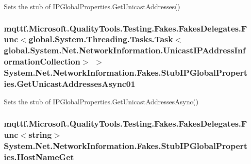 Sets the stub of I\-P\-Global\-Properties.\-Get\-Unicast\-Addresses()

\hypertarget{class_system_1_1_net_1_1_network_information_1_1_fakes_1_1_stub_i_p_global_properties_aa64c82eebf83d5297875fd65a2bcd978}{
\subsubsection[{Get\-Unicast\-Addresses\-Async01}]{\setlength{\rightskip}{0pt plus 5cm}mqttf.\-Microsoft.\-Quality\-Tools.\-Testing.\-Fakes.\-Fakes\-Delegates.\-Func$<$global.\-System.\-Threading.\-Tasks.\-Task$<$global.\-System.\-Net.\-Network\-Information.\-Unicast\-I\-P\-Address\-Information\-Collection$>$ $>$ System.\-Net.\-Network\-Information.\-Fakes.\-Stub\-I\-P\-Global\-Properties.\-Get\-Unicast\-Addresses\-Async01}}\label{class_system_1_1_net_1_1_network_information_1_1_fakes_1_1_stub_i_p_global_properties_aa64c82eebf83d5297875fd65a2bcd978}


Sets the stub of I\-P\-Global\-Properties.\-Get\-Unicast\-Addresses\-Async()

\hypertarget{class_system_1_1_net_1_1_network_information_1_1_fakes_1_1_stub_i_p_global_properties_af7d0577b0832c7aa0039246d5263753f}{
\subsubsection[{Host\-Name\-Get}]{\setlength{\rightskip}{0pt plus 5cm}mqttf.\-Microsoft.\-Quality\-Tools.\-Testing.\-Fakes.\-Fakes\-Delegates.\-Func$<$string$>$ System.\-Net.\-Network\-Information.\-Fakes.\-Stub\-I\-P\-Global\-Properties.\-Host\-Name\-Get}}\label{class_system_1_1_net_1_1_network_information_1_1_fakes_1_1_stub_i_p_global_properties_af7d0577b0832c7aa0039246d5263753f}



